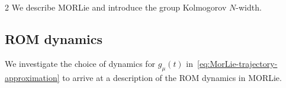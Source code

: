 \documentclass{article}
\newtheorem{definition}[theorem]{Definition}
\newcommand{\M}{\mathcal{M}}                                %
\newcommand{\state}{x}
\begin{document}
\begin{multicols}{2}
We describe MORLie and introduce the group Kolmogorov $N$-width. 

\subsection{ROM dynamics}\label{ssec:MORLie_Theory}





We investigate the choice of dynamics for $g_\mu(t)$ in~\eqref{eq:MorLie-trajectory-approximation} to arrive at a description of the ROM dynamics in MORLie. 


\end{multicols}
\end{document}
